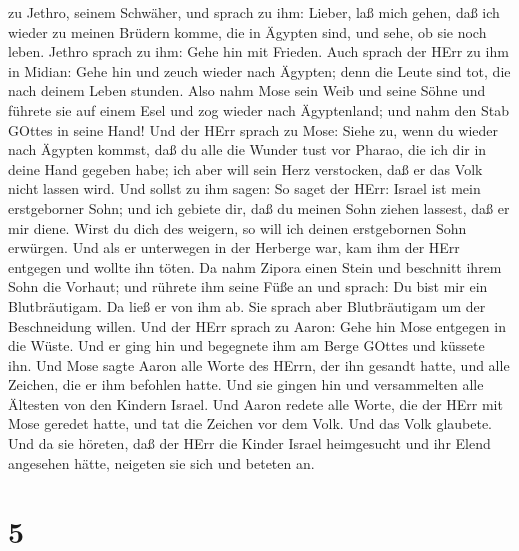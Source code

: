 zu Jethro, seinem Schwäher, und sprach zu ihm: Lieber, laß mich gehen,
daß ich wieder zu meinen Brüdern komme, die in Ägypten sind, und sehe,
ob sie noch leben. Jethro sprach zu ihm: Gehe hin mit Frieden.
 Auch sprach der HErr zu ihm in Midian: Gehe hin und zeuch
wieder nach Ägypten; denn die Leute sind tot, die nach deinem Leben
stunden.  Also nahm Mose sein Weib und seine Söhne und
führete sie auf einem Esel und zog wieder nach Ägyptenland; und nahm den
Stab GOttes in seine Hand!  Und der HErr sprach zu Mose:
Siehe zu, wenn du wieder nach Ägypten kommst, daß du alle die Wunder
tust vor Pharao, die ich dir in deine Hand gegeben habe; ich aber will
sein Herz verstocken, daß er das Volk nicht lassen wird. 
Und sollst zu ihm sagen: So saget der HErr: Israel ist mein erstgeborner
Sohn;  und ich gebiete dir, daß du meinen Sohn ziehen
lassest, daß er mir diene. Wirst du dich des weigern, so will ich deinen
erstgebornen Sohn erwürgen.  Und als er unterwegen in der
Herberge war, kam ihm der HErr entgegen und wollte ihn töten.
 Da nahm Zipora einen Stein und beschnitt ihrem Sohn die
Vorhaut; und rührete ihm seine Füße an und sprach: Du bist mir ein
Blutbräutigam.  Da ließ er von ihm ab. Sie sprach aber
Blutbräutigam um der Beschneidung willen.  Und der HErr
sprach zu Aaron: Gehe hin Mose entgegen in die Wüste. Und er ging hin
und begegnete ihm am Berge GOttes und küssete ihn.  Und
Mose sagte Aaron alle Worte des HErrn, der ihn gesandt hatte, und alle
Zeichen, die er ihm befohlen hatte.  Und sie gingen hin und
versammelten alle Ältesten von den Kindern Israel.  Und
Aaron redete alle Worte, die der HErr mit Mose geredet hatte, und tat
die Zeichen vor dem Volk.  Und das Volk glaubete. Und da
sie höreten, daß der HErr die Kinder Israel heimgesucht und ihr Elend
angesehen hätte, neigeten sie sich und beteten an.

\hypertarget{section-4}{%
\section{5}\label{section-4}}

